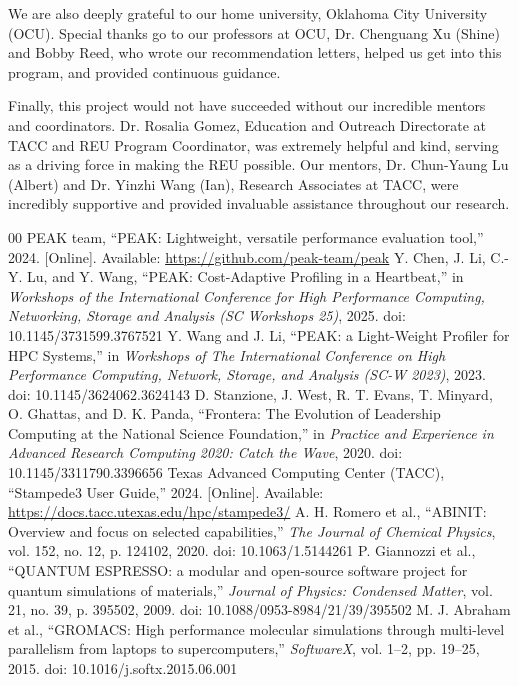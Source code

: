 \documentclass[conference]{IEEEtran}
\begin{document}
We are also deeply grateful to our home university, Oklahoma City University (OCU). Special thanks go to our professors at OCU, Dr. Chenguang Xu (Shine) and Bobby Reed, who wrote our recommendation letters, helped us get into this program, and provided continuous guidance.

Finally, this project would not have succeeded without our incredible mentors and coordinators. Dr. Rosalia Gomez, Education and Outreach Directorate at TACC and REU Program Coordinator, was extremely helpful and kind, serving as a driving force in making the REU possible. Our mentors, Dr. Chun-Yaung Lu (Albert) and Dr. Yinzhi Wang (Ian), Research Associates at TACC, were incredibly supportive and provided invaluable assistance throughout our research.

\begin{thebibliography}{00}
 PEAK team, ``PEAK: Lightweight, versatile performance evaluation tool,'' 2024. [Online]. Available: \url{https://github.com/peak-team/peak}
 Y. Chen, J. Li, C.-Y. Lu, and Y. Wang, ``PEAK: Cost-Adaptive Profiling in a Heartbeat,'' in \textit{Workshops of the International Conference for High Performance Computing, Networking, Storage and Analysis (SC Workshops 25)}, 2025. doi: 10.1145/3731599.3767521
 Y. Wang and J. Li, ``PEAK: a Light-Weight Profiler for HPC Systems,'' in \textit{Workshops of The International Conference on High Performance Computing, Network, Storage, and Analysis (SC-W 2023)}, 2023. doi: 10.1145/3624062.3624143
 D. Stanzione, J. West, R. T. Evans, T. Minyard, O. Ghattas, and D. K. Panda, ``Frontera: The Evolution of Leadership Computing at the National Science Foundation,'' in \textit{Practice and Experience in Advanced Research Computing 2020: Catch the Wave}, 2020. doi: 10.1145/3311790.3396656
 Texas Advanced Computing Center (TACC), ``Stampede3 User Guide,'' 2024. [Online]. Available: \url{https://docs.tacc.utexas.edu/hpc/stampede3/}
 A. H. Romero et al., ``ABINIT: Overview and focus on selected capabilities,'' \textit{The Journal of Chemical Physics}, vol. 152, no. 12, p. 124102, 2020. doi: 10.1063/1.5144261
 P. Giannozzi et al., ``QUANTUM ESPRESSO: a modular and open-source software project for quantum simulations of materials,'' \textit{Journal of Physics: Condensed Matter}, vol. 21, no. 39, p. 395502, 2009. doi: 10.1088/0953-8984/21/39/395502
 M. J. Abraham et al., ``GROMACS: High performance molecular simulations through multi-level parallelism from laptops to supercomputers,'' \textit{SoftwareX}, vol. 1--2, pp. 19--25, 2015. doi: 10.1016/j.softx.2015.06.001

\end{thebibliography}
\end{document}
